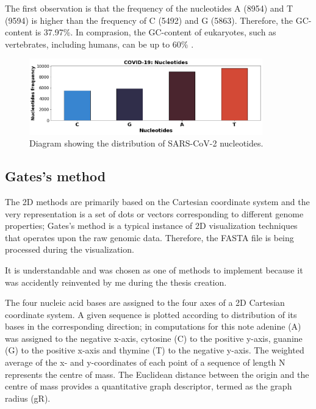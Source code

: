 The first observation is that the frequency of the nucleotides A (8954) and T (9594)  is higher than the frequency of C (5492) and G (5863). 
Therefore, the GC-content is 37.97\%. 
In comprasion, the GC-content of eukaryotes, such as vertebrates, including humans, can be up to 60\% \cite{gccontent3}.

\begin{figure}[!ht]
	\centering
	\includegraphics[width=0.9\textwidth]{figures/covidnucleotides.png}
	\caption{Diagram showing the distribution of SARS-CoV-2 nucleotides.\label{o:latex_friendly_zone}}
\end{figure}

\subsection{Gates's method}
The 2D methods are primarily based on the Cartesian coordinate system and the very representation is a set of dots or vectors corresponding to different genome properties;
Gates's method is a typical instance of 2D visualization techniques that operates upon the raw genomic data.
Therefore, the FASTA file is being processed during the visualization.

It is understandable and was chosen as one of methods to implement because it was accidently reinvented by me during the thesis creation.

The four nucleic acid bases are assigned to the four axes of a 2D Cartesian coordinate system.
A given sequence is plotted according to distribution of its bases in the corresponding direction; 
in computations for this note adenine (A) was assigned to the negative x-axis, cytosine (C) to the positive y-axis, guanine (G) to the positive x-axis and thymine (T) to the negative y-axis. 
The weighted average of the x- and y-coordinates of each point of a sequence of length N represents the centre of mass. 
The Euclidean distance between the origin and the centre of mass provides a quantitative graph descriptor, termed as the graph radius (gR). 

